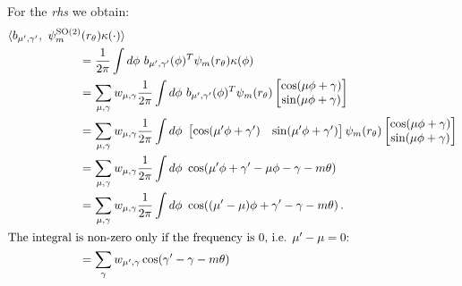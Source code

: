 \documentclass{article}
\newcommand{\SO}[1]{\ensuremath{\operatorname{SO}(#1)}}
\begin{document}
For the \textit{rhs} we obtain:
\begin{align*}
	&\langle b_{\mu',\gamma'},\ \psi_m^{\SO2}(r_\theta)\kappa(\cdot) \rangle \\
	&\qquad\qquad\qquad= {1\over2\pi}\int d\phi \ b_{\mu',\gamma'}(\phi)^T \psi_m(r_\theta) \kappa(\phi) \\
&\qquad\qquad\qquad= \sum_{\mu, \gamma} w_{\mu, \gamma} {1\over2\pi}\int d\phi \ b_{\mu',\gamma'}(\phi)^T 
	\psi_m(r_\theta) \begin{bmatrix} \cos(\mu\phi + \gamma) \\ \sin(\mu\phi + \gamma) \end{bmatrix}\\
	&\qquad\qquad\qquad= \sum_{\mu, \gamma} w_{\mu, \gamma} {1\over2\pi}\int d\phi \ 
	\begin{bmatrix} \cos(\mu'\phi + \gamma') & \sin(\mu'\phi + \gamma') \end{bmatrix}
	\psi_m(r_\theta) \begin{bmatrix} \cos(\mu\phi + \gamma) \\ \sin(\mu\phi + \gamma) \end{bmatrix}\\
	&\qquad\qquad\qquad= \sum_{\mu, \gamma} w_{\mu, \gamma} {1\over2\pi}\int d\phi \ \cos(\mu'\phi + \gamma' -\mu\phi - \gamma -m\theta) \\
	&\qquad\qquad\qquad= \sum_{\mu, \gamma} w_{\mu, \gamma} {1\over2\pi}\int d\phi \ \cos((\mu' - \mu)\phi + \gamma' - \gamma -m\theta)\,. \\
\intertext{The integral is non-zero only if the frequency is $0$, i.e. $\mu' - \mu = 0$: }
	&\qquad\qquad\qquad= \sum_{\gamma} w_{\mu', \gamma} \cos(\gamma'-\gamma -m\theta)
\end{align*}
\end{document}
